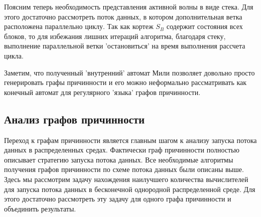 \documentclass[10pt,a4paper]{article}
\begin{document}
  Поясним теперь необходимость представления активной волны в виде стека. Для этого достаточно рассмотреть поток данных, в котором дополнительная ветка расположена параллельно циклу.
  Так как кортеж $S_B$ содержит состояния всех блоков, то для избежания лишних итераций алгоритма, благодаря стеку, выполнение параллельной ветки 'остановиться' на время выполнения
  рассчета цикла.
  
  Заметим, что полученный 'внутренний' автомат Мили позволяет довольно просто генерировать графы причинности и его можно неформально рассматривать
  как конечный автомат для регулярного 'языка' графов причинности.

\subsection{Анализ графов причинности}
  Переход к графам причинности является главным шагом к анализу запуска потока данных в распределенных средах.
  Фактически граф причинности полностью описывает стратегию запуска потока данных. Все необходимые алгоритмы получения графов причинности по схеме потока данных
  были описаны выше. Здесь мы рассмотрим задачу нахождения наилучшего количества вычислителей для
  запуска потока данных в бесконечной однородной распределенной среде. Для этого достаточно рассмотреть эту задачу для одного графа причинности и объединить результаты.
  
\end{document}
